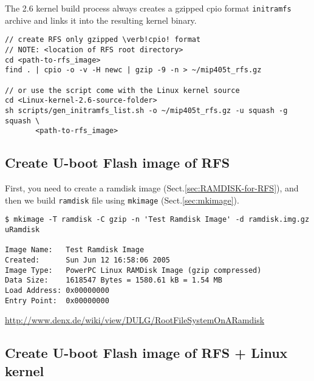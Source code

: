 The 2.6 kernel build process always creates a gzipped cpio format \verb!initramfs!
archive and links it into the resulting kernel binary. 
  
\begin{verbatim}
// create RFS only gzipped \verb!cpio! format  
// NOTE: <location of RFS root directory>
cd <path-to-rfs_image>
find . | cpio -o -v -H newc | gzip -9 -n > ~/mip405t_rfs.gz

// or use the script come with the Linux kernel source
cd <Linux-kernel-2.6-source-folder>
sh scripts/gen_initramfs_list.sh -o ~/mip405t_rfs.gz -u squash -g squash \
       <path-to-rfs_image>
\end{verbatim}



\subsection{Create U-boot Flash image of RFS}
\label{sec:Create-U-boot-image}

First, you need to create a ramdisk image (Sect.\ref{sec:RAMDISK-for-RFS}),
and then we build \verb!ramdisk! file using \verb!mkimage!
(Sect.\ref{sec:mkimage}).

\begin{verbatim}
$ mkimage -T ramdisk -C gzip -n 'Test Ramdisk Image' -d ramdisk.img.gz uRamdisk

Image Name:   Test Ramdisk Image
Created:      Sun Jun 12 16:58:06 2005
Image Type:   PowerPC Linux RAMDisk Image (gzip compressed)
Data Size:    1618547 Bytes = 1580.61 kB = 1.54 MB
Load Address: 0x00000000
Entry Point:  0x00000000
\end{verbatim}
\url{http://www.denx.de/wiki/view/DULG/RootFileSystemOnARamdisk}
 
\subsection{Create U-boot Flash image of RFS + Linux kernel}
\label{sec:Create-Flash-image}

